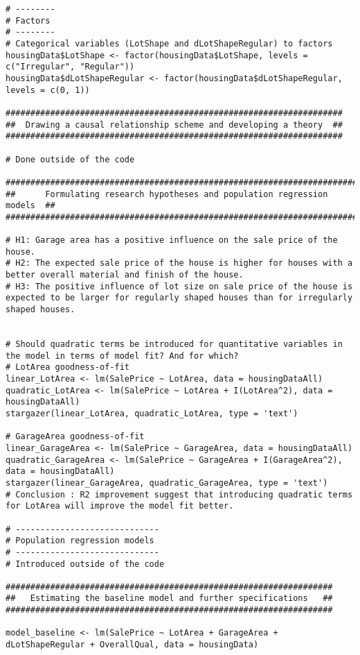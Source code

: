 \documentclass{article}
\begin{document}
\begin{tiny}
\begin{verbatim}
# --------
# Factors
# --------
# Categorical variables (LotShape and dLotShapeRegular) to factors
housingData$LotShape <- factor(housingData$LotShape, levels = c("Irregular", "Regular"))
housingData$dLotShapeRegular <- factor(housingData$dLotShapeRegular, levels = c(0, 1))

####################################################################
##  Drawing a causal relationship scheme and developing a theory  ##
####################################################################

# Done outside of the code

############################################################################
##      Formulating research hypotheses and population regression models  ##
############################################################################

# H1: Garage area has a positive influence on the sale price of the house.
# H2: The expected sale price of the house is higher for houses with a better overall material and finish of the house.
# H3: The positive influence of lot size on sale price of the house is expected to be larger for regularly shaped houses than for irregularly shaped houses.


# Should quadratic terms be introduced for quantitative variables in the model in terms of model fit? And for which?
# LotArea goodness-of-fit
linear_LotArea <- lm(SalePrice ~ LotArea, data = housingDataAll)
quadratic_LotArea <- lm(SalePrice ~ LotArea + I(LotArea^2), data = housingDataAll)
stargazer(linear_LotArea, quadratic_LotArea, type = 'text')

# GarageArea goodness-of-fit
linear_GarageArea <- lm(SalePrice ~ GarageArea, data = housingDataAll)
quadratic_GarageArea <- lm(SalePrice ~ GarageArea + I(GarageArea^2), data = housingDataAll)
stargazer(linear_GarageArea, quadratic_GarageArea, type = 'text')
# Conclusion : R2 improvement suggest that introducing quadratic terms for LotArea will improve the model fit better. 

# -----------------------------
# Population regression models
# -----------------------------
# Introduced outside of the code

##################################################################
##   Estimating the baseline model and further specifications   ##
##################################################################

model_baseline <- lm(SalePrice ~ LotArea + GarageArea + dLotShapeRegular + OverallQual, data = housingData)


\end{verbatim}
\end{tiny}
\end{document}
